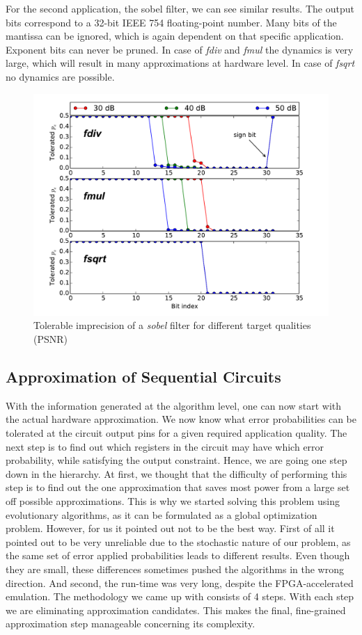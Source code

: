 \documentclass[conference]{IEEEtran}
\begin{document}
For the second application, the sobel filter, we can see similar results. The output bits correspond to a 32-bit IEEE 754 floating-point number. Many bits of the mantissa can be ignored, which is again dependent on that specific application. Exponent bits can never be pruned. In case of \emph{fdiv} and \emph{fmul} the dynamics is very large, which will result in many approximations at hardware level. In case of \emph{fsqrt} no dynamics are possible.
\begin{figure}[tb]
  \centering
  \includegraphics[width=.5\textwidth]{figs/metrics_sobel}
  \caption{Tolerable imprecision of a \emph{sobel} filter for different target qualities (PSNR)}
  \label{fig:metrics_sobel}
\end{figure}


\subsection{Approximation of Sequential Circuits}
\label{subsec:approximation}
With the information generated at the algorithm level, one can now start with the actual hardware approximation. We now know what error probabilities can be tolerated at the circuit output pins for a given required application quality. The next step is to find out which registers in the circuit may have which error probability, while satisfying the output constraint. Hence, we are going one step down in the hierarchy. At first, we thought that the difficulty of performing this step is to find out the one approximation that saves most power from a large set off possible approximations. This is why we started solving this problem using evolutionary algorithms, as it can be formulated as a global optimization problem. However, for us it pointed out not to be the best way. First of all it pointed out to be very unreliable due to the stochastic nature of our problem, as the same set of error applied probabilities leads to different results. Even though they are small, these differences sometimes pushed the algorithms in the wrong direction. And second, the run-time was very long, despite the FPGA-accelerated emulation. The methodology we came up with consists of 4 steps. With each step we are eliminating approximation candidates. This makes the final, fine-grained approximation step manageable concerning its complexity.  
\end{document}
